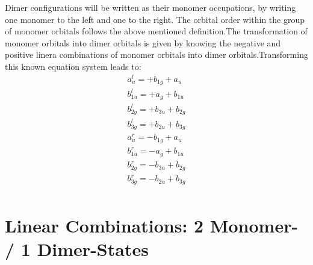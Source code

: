 \documentclass{article}
\begin{document}
Dimer configurations will be written as their monomer occupations, by writing one monomer to the left and one to the right. The orbital order within the group of monomer orbitals follows the above mentioned definition.\vspace{2cm}The transformation of monomer orbitals into dimer orbitals is given by knowing the negative and positive linera combinations of monomer orbitals into dimer orbitals.Transforming this known equation system leads to:
\begin{subequations}\begin{gather}
a_{u}^{l} = +b_{1g}+a_{u}  \\
b_{1u}^{l} = +a_{g}+b_{1u}  \\
b_{2g}^{l} = +b_{3u}+b_{2g}  \\
b_{3g}^{l} = +b_{2u}+b_{3g}  \\
a_{u}^{r} = -b_{1g}+a_{u}  \\
b_{1u}^{r} = -a_{g}+b_{1u}  \\
b_{2g}^{r} = -b_{3u}+b_{2g}  \\
b_{3g}^{r} = -b_{2u}+b_{3g}  \\
\end{gather}\end{subequations}
\newpage \section{Linear Combinations: 2 Monomer- / 1 Dimer-States}
\end{document}

